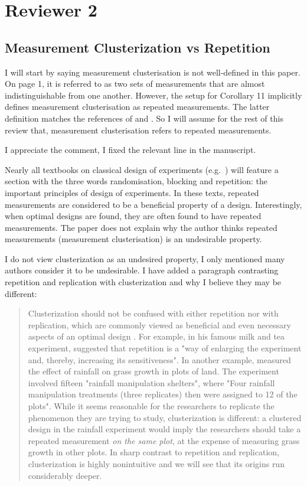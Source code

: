 \section{Reviewer 2}
\subsection{Measurement Clusterization vs Repetition}
\RC I will start by saying measurement clusterisation is not
well-defined in this paper. On page 1, it is referred to as two sets
of measurements that are almost indistinguishable from one
another. However, the setup for Corollary 11 implicitly defines
measurement clusterisation as repeated measurements. The latter
definition matches the references of \cite{fedorov1996} and
\cite{nyberg2012}. So I will assume for the rest of this review that,
measurement clusterisation refers to repeated measurements.

\AR I appreciate the comment, I fixed the relevant line in the
manuscript.


\RC Nearly all textbooks on classical design of experiments
(e.g.~\cite[Section 1.2.4]{morris2011}) will feature a section with
the three words randomisation, blocking and repetition: the important
principles of design of experiments.  In these texts, repeated
measurements are considered to be a beneficial property of a
design. Interestingly, when optimal designs are found, they are often
found to have repeated measurements. The paper does not explain why
the author thinks repeated measurements (measurement clusterisation)
is an undesirable property.

\AR I do not view clusterization as an undesired property, I only
mentioned many authors consider it to be undesirable. I have added a
paragraph contrasting repetition and replication with clusterization
and why I believe they may be different:


\begin{quote}
  Clusterization should not be confused with either repetition nor
  with replication, which are commonly viewed as beneficial and even
  necessary aspects of an optimal design \cite{fisher1949design,
    morris2011, schafer2001replication}. For example,
  \cite{fisher1949design} in his famous milk and tea experiment,
  suggested that repetition is a "way of enlarging the experiment and,
  thereby, increasing its sensitiveness". In another example,
  \cite{fay2000rainfall} measured the effect of rainfall on grass
  growth in plots of land. The experiment involved fifteen "rainfall
  manipulation shelters", where "Four rainfall manipulation treatments
  (three replicates) then were assigned to 12 of the plots". While it
  seems reasonable for the researchers to replicate the phenomenon
  they are trying to study, clusterization is different: a clustered
  design in the rainfall experiment would imply the researchers should
  take a repeated measurement \emph{on the same plot}, at the expense
  of measuring grass growth in other plots. In sharp contrast to
  repetition and replication, clusterization is highly nonintuitive
  and we will see that its origins run considerably deeper.
\end{quote}



